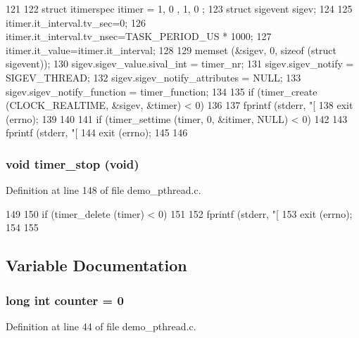 \begin{DoxyCode}
121 {
122     struct itimerspec itimer = { { 1, 0 }, { 1, 0 } };
123     struct sigevent sigev;
124 
125     itimer.it_interval.tv_sec=0;
126     itimer.it_interval.tv_nsec=TASK_PERIOD_US * 1000; 
127     itimer.it_value=itimer.it_interval;
128 
129     memset (&sigev, 0, sizeof (struct sigevent));
130     sigev.sigev_value.sival_int = timer_nr;
131     sigev.sigev_notify = SIGEV_THREAD;
132     sigev.sigev_notify_attributes = NULL;
133     sigev.sigev_notify_function = timer_function;
134 
135     if (timer_create (CLOCK_REALTIME, &sigev, &timer) < 0)
136     {
137         fprintf (stderr, "[%
138         exit (errno);
139     }
140 
141     if (timer_settime (timer, 0, &itimer, NULL) < 0)
142     {
143         fprintf (stderr, "[%
144         exit (errno);
145     }
146 }
\end{DoxyCode}
\subsubsection[{timer\_\-stop}]{\setlength{\rightskip}{0pt plus 5cm}void timer\_\-stop (void)}\label{demo__pthread_8c_a37980fc313f86d7f40a3d7643861ed29}


Definition at line 148 of file demo\_\-pthread.c.


\begin{DoxyCode}
149 {
150     if (timer_delete (timer) < 0)
151     {
152         fprintf (stderr, "[%
153         exit (errno);
154     }
155 }
\end{DoxyCode}


\subsection{Variable Documentation}
\subsubsection[{counter}]{\setlength{\rightskip}{0pt plus 5cm}long int {\bf counter} = 0}\label{demo__pthread_8c_a82c0c836d4653e610a10c3a571375098}


Definition at line 44 of file demo\_\-pthread.c.
